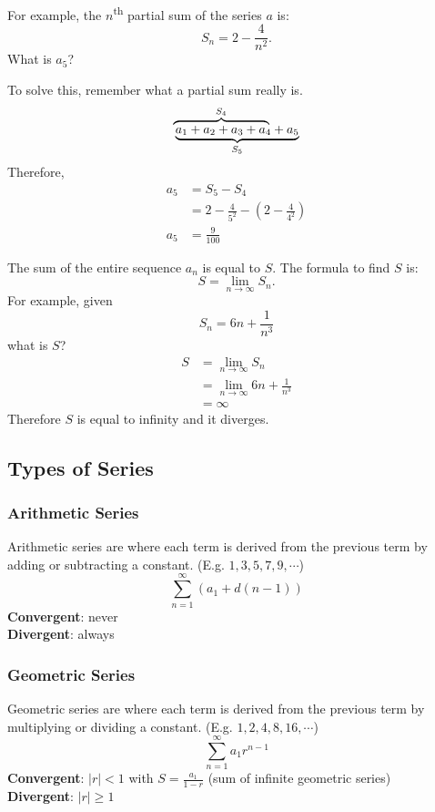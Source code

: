 \documentclass[12pt]{article}
\begin{document}
\noindent For example, the $n$\textsuperscript{th} partial sum of the series $a$ is:
\[ S_n = 2 - \frac{4}{n^2}. \]
What is $a_5$?

\noindent To solve this, remember what a partial sum really is.
\[ \rlap{$\overbrace{\phantom{a_1 + a_2 + a_3 + a_4}}^{S_4}$} \underbrace{a_1 + a_2 + a_3 + a_4 + a_5}_{S_5} \]
Therefore,
\begin{align*}
    a_5 & = S_5 - S_4                                            \\
        & = 2 - \frac{4}{5^2} - \left( 2 - \frac{4}{4^2} \right) \\[6pt]
    a_5 & = \frac{9}{100}
\end{align*}

The sum of the entire sequence $a_n$ is equal to $S$. The formula to find $S$ is:
\[ S = \lim_{n \to \infty} S_n. \]
For example, given
\[ S_n = 6n + \frac{1}{n^3} \]
what is $S$?
\begin{align*}
    S & = \lim_{n \to \infty} S_n                \\
      & = \lim_{n \to \infty} 6n + \frac{1}{n^3} \\[6pt]
      & = \infty
\end{align*}
Therefore $S$ is equal to infinity and it diverges.

\subsection{Types of Series}
\subsubsection{Arithmetic Series}
Arithmetic series are where each term is derived from the previous term by adding or subtracting a constant. (E.g. $1, 3, 5, 7, 9, \cdots$)
\[ \sum_{n=1}^\infty (a_1 + d(n-1)) \]
\textbf{Convergent}: never
\\ \textbf{Divergent}: always

\subsubsection{Geometric Series}
Geometric series are where each term is derived from the previous term by multiplying or dividing a constant. (E.g. $1, 2, 4, 8, 16, \cdots$)
\[ \sum_{n=1}^\infty a_1r^{n-1} \]
\textbf{Convergent}: $|r| < 1$ with $S = \frac{a_1}{1-r}$ (sum of infinite geometric series)
\\ \textbf{Divergent}: $|r| \ge 1$
\end{document}

